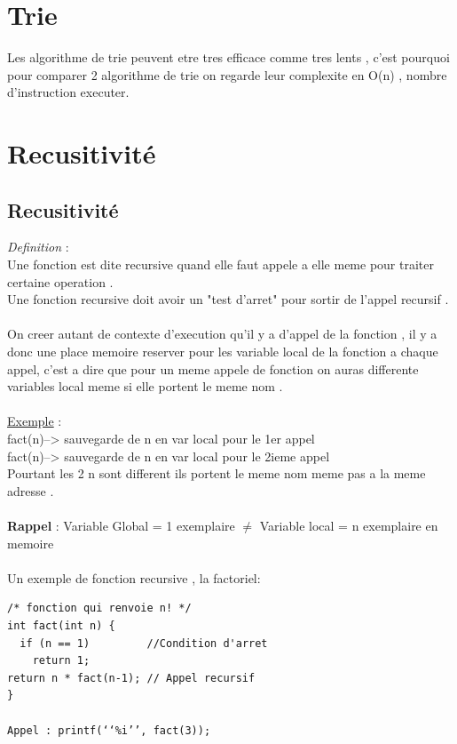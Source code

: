 \documentclass[a4paper,12pt,openany]{book}
\begin{document}

\chapter{Trie}

Les algorithme de trie peuvent etre tres efficace comme tres lents , c'est pourquoi pour comparer 2 algorithme de trie on regarde leur complexite en O(n) , nombre d'instruction executer.\\




\chapter{Recusitivité}

\section{Recusitivité}

\emph{Definition} : \\
Une fonction est dite recursive quand elle faut appele a elle meme pour traiter certaine operation .\\
Une fonction recursive doit avoir un "test d'arret" pour sortir de l'appel recursif .\\
\\
On creer autant de contexte d'execution qu'il y a d'appel de la fonction , il y a donc une place  memoire reserver pour les variable local de la fonction a chaque appel, c'est a dire que pour un  meme appele de fonction on auras differente variables local meme si elle portent le meme nom .\\
\\
\underline{Exemple} : \\
fact(n)--> sauvegarde de n en var local pour le 1er appel\\
fact(n)--> sauvegarde de n en var local pour le 2ieme appel\\
Pourtant les 2 n sont different ils portent le meme nom meme pas a la meme adresse .\\ 
\\
\textbf{Rappel} : Variable Global = 1 exemplaire $\neq$ Variable local = n exemplaire en memoire \\
\\
Un exemple de fonction recursive , la factoriel: \\
\begin{verbatim}
/* fonction qui renvoie n! */
int fact(int n) {
  if (n == 1)         //Condition d'arret
    return 1;
return n * fact(n-1); // Appel recursif
}

Appel : printf(‘‘%i’’, fact(3));
\end{verbatim}
\end{document}
